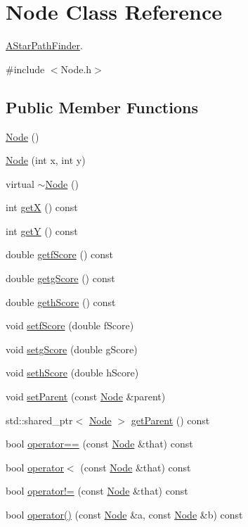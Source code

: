 \hypertarget{classNode}{}\section{Node Class Reference}
\label{classNode}


\hyperlink{classAStarPathFinder}{A\+Star\+Path\+Finder}.  




{\ttfamily \#include $<$Node.\+h$>$}

\subsection*{Public Member Functions}
\begin{DoxyCompactItemize}
\item 
\hyperlink{classNode_ad7a34779cad45d997bfd6d3d8043c75f}{Node} ()
\item 
\hyperlink{classNode_a23a19f53dfbb18fec58cdac90de3d144}{Node} (int x, int y)
\item 
virtual \hyperlink{classNode_aa0840c3cb5c7159be6d992adecd2097c}{$\sim$\+Node} ()
\item 
int \hyperlink{classNode_aa45b6294ee8c7aafdf5a1450f879c598}{getX} () const 
\item 
int \hyperlink{classNode_a81610ad138e2ac2cca79603032aaafc1}{getY} () const 
\item 
double \hyperlink{classNode_af2d1b4d63492be819be4566bf23c2215}{getf\+Score} () const 
\item 
double \hyperlink{classNode_a6d96ac905adeaa43c9ec4cef44f5617b}{getg\+Score} () const 
\item 
double \hyperlink{classNode_a04d718022d49c317f12ecbe2829642e7}{geth\+Score} () const 
\item 
void \hyperlink{classNode_a5c3c70e327b9e358435ef1689eeb81b0}{setf\+Score} (double f\+Score)
\item 
void \hyperlink{classNode_a00e41993c05f5bfc5db6d98a58680c51}{setg\+Score} (double g\+Score)
\item 
void \hyperlink{classNode_afc359dbe960036d705b2d68a697a416e}{seth\+Score} (double h\+Score)
\item 
void \hyperlink{classNode_a4c4c80be951d7b2a08b7b061cc9add13}{set\+Parent} (const \hyperlink{classNode}{Node} \&parent)
\item 
std\+::shared\+\_\+ptr$<$ \hyperlink{classNode}{Node} $>$ \hyperlink{classNode_a707ec5f7e95ba42c15c263adc1ee70fe}{get\+Parent} () const 
\item 
bool \hyperlink{classNode_a33836aa8a9e679df56237e2cbff64475}{operator==} (const \hyperlink{classNode}{Node} \&that) const 
\item 
bool \hyperlink{classNode_a28321fd17adb733e76052d31065de894}{operator$<$} (const \hyperlink{classNode}{Node} \&that) const 
\item 
bool \hyperlink{classNode_a960471106e7e4de5904149a9a3ada920}{operator!=} (const \hyperlink{classNode}{Node} \&that) const 
\item 
bool \hyperlink{classNode_a98fe48fa4761cda6ebc90080635f66e6}{operator()} (const \hyperlink{classNode}{Node} \&a, const \hyperlink{classNode}{Node} \&b) const 
\end{DoxyCompactItemize}


